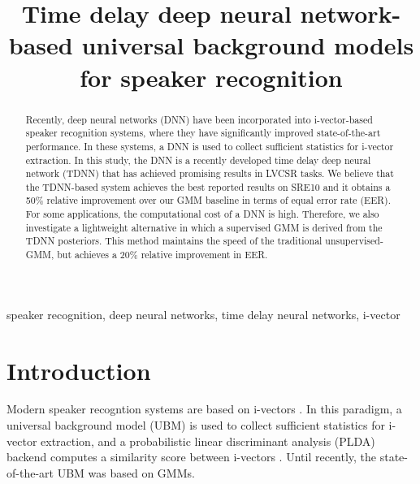 \documentclass{article}
\title{Time delay deep neural network-based universal background models for speaker recognition\vspace{-2ex}}
\begin{document}
%
\maketitle
%
\begin{abstract}

Recently, deep neural networks (DNN) have been incorporated into i-vector-based speaker
recognition systems, where they have significantly improved state-of-the-art performance. In these
systems, a DNN is used to collect sufficient statistics for i-vector extraction.
In this study, the DNN is a recently developed time delay deep neural network
(TDNN) that has achieved promising results in LVCSR tasks. 
We believe that the
TDNN-based system achieves the best reported results on SRE10 and it obtains a 50\% relative 
improvement over our GMM baseline in terms of equal error rate (EER). 
For some applications, the computational cost of a DNN is high. 
Therefore, we also investigate a lightweight alternative in which a supervised GMM is derived from
the TDNN posteriors. This method maintains the speed of the traditional unsupervised-GMM,
but achieves a 20\% relative improvement in EER.
\end{abstract}
%
\begin{keywords}
speaker recognition, deep neural networks, time delay neural networks, i-vector
\end{keywords}
%
\vspace{12mm}
\section{Introduction}
\label{sec:intro}

Modern speaker recogntion systems are based on i-vectors \cite{ivector}.
In this paradigm, a universal background model (UBM) is used to collect
sufficient statistics for i-vector extraction, and a probabilistic 
linear discriminant analysis (PLDA) backend computes a similarity score between i-vectors
 \cite{plda_prince, brummer2010speaker, kenny2010bayesian, villalba2011towards, garcia2011analysis, garcia2012multicondition}.
Until recently, the state-of-the-art UBM was based on GMMs.
\end{document}
